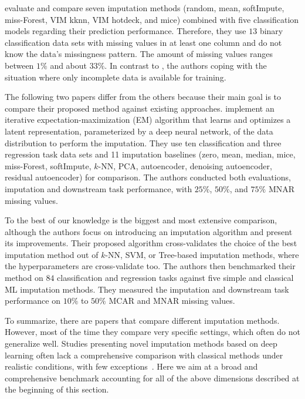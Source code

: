 \cite{Imputation_Benchmark_1} evaluate and compare seven imputation methods (random, mean, softImpute, miss-Forest, VIM kknn, VIM hotdeck, and mice) combined with five classification models regarding their prediction performance. Therefore,  they use $13$ binary classification data sets with missing values in at least one column and do not know the data's missingness pattern. The amount of missing values ranges between $1\%$ and about $33\%$. In contrast to \citep{Imputation_Benchmark_3, Imputation_Benchmark_2}, the authors coping with the situation where only incomplete data is available for training.

The following two papers differ from the others because their main goal is to compare their proposed method against existing approaches. \cite{Imputation_Benchmark_6} implement an iterative expectation-maximization (EM) algorithm that learns and optimizes a latent representation, parameterized by a deep neural network, of the data distribution to perform the imputation. They use ten classification and three regression task data sets and 11 imputation baselines (zero, mean, median, mice, miss-Forest, softImpute, $k$-NN, PCA, autoencoder, denoising autoencoder, residual autoencoder) for comparison. The authors conducted both evaluations, imputation and downstream task performance, with $25\%$, $50\%$, and $75\%$ MNAR missing values.

To the best of our knowledge \citep{Imputation_Benchmark_4} is the biggest and most extensive comparison, although the authors focus on introducing an imputation algorithm and present its improvements. Their proposed algorithm cross-validates the choice of the best imputation method out of $k$-NN, SVM, or Tree-based imputation methods, where the hyperparameters are cross-validate too. The authors then benchmarked their method on $84$ classification and regression tasks against five simple and classical ML imputation methods. They measured the imputation and downstream task performance on $10\%$ to $50\%$ MCAR and MNAR missing values.

To summarize, there are papers that compare different imputation methods. However, most of the time they compare very specific settings, which often do not generalize well. Studies presenting novel imputation methods based on deep learning often lack a comprehensive comparison with classical methods under realistic conditions, with few exceptions~\citep{Imputation_Benchmark_6}. Here we aim at a broad and comprehensive benchmark accounting for all of the above dimensions described at the beginning of this section.

